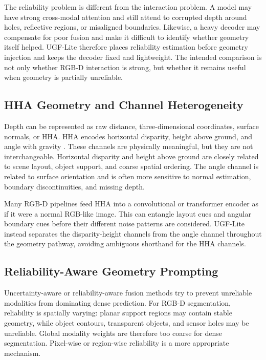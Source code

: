 \documentclass[a4paper,fleqn]{cas-dc}
\begin{document}
The reliability problem is different from the interaction problem. A model may have strong cross-modal attention and still attend to corrupted depth around holes, reflective regions, or misaligned boundaries. Likewise, a heavy decoder may compensate for poor fusion and make it difficult to identify whether geometry itself helped. UGF-Lite therefore places reliability estimation before geometry injection and keeps the decoder fixed and lightweight. The intended comparison is not only whether RGB-D interaction is strong, but whether it remains useful when geometry is partially unreliable.

\subsection{HHA Geometry and Channel Heterogeneity}

Depth can be represented as raw distance, three-dimensional coordinates, surface normals, or HHA. HHA encodes horizontal disparity, height above ground, and angle with gravity \citep{gupta2014hha}. These channels are physically meaningful, but they are not interchangeable. Horizontal disparity and height above ground are closely related to scene layout, object support, and coarse spatial ordering. The angle channel is related to surface orientation and is often more sensitive to normal estimation, boundary discontinuities, and missing depth.

Many RGB-D pipelines feed HHA into a convolutional or transformer encoder as if it were a normal RGB-like image. This can entangle layout cues and angular boundary cues before their different noise patterns are considered. UGF-Lite instead separates the disparity-height channels from the angle channel throughout the geometry pathway, avoiding ambiguous shorthand for the HHA channels.

\subsection{Reliability-Aware Geometry Prompting}

Uncertainty-aware or reliability-aware fusion methods try to prevent unreliable modalities from dominating dense prediction. For RGB-D segmentation, reliability is spatially varying: planar support regions may contain stable geometry, while object contours, transparent objects, and sensor holes may be unreliable. Global modality weights are therefore too coarse for dense segmentation. Pixel-wise or region-wise reliability is a more appropriate mechanism.
\end{document}
